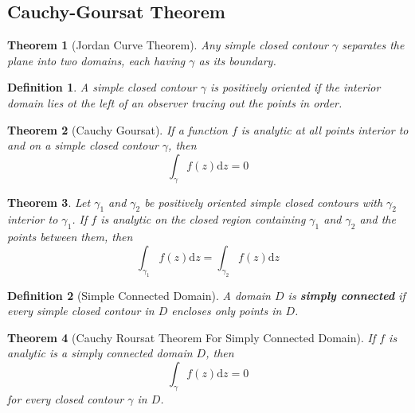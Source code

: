 \documentclass[12pt]{article}
\newcommand{\diff}{\mathrm{d}}
\newtheorem{definition}{Definition}[section]
\newtheorem{theorem}{Theorem}[section]
\theoremstyle{definition}
\begin{document}
\subsection{Cauchy-Goursat Theorem}
\begin{theorem}[Jordan Curve Theorem]
\normalfont Any simple closed contour $\gamma$ separates the plane into two domains, each having $\gamma$ as its boundary.
\end{theorem}
\begin{definition} \normalfont A simple closed contour $\gamma$ is positively oriented if the interior domain lies ot the left of an observer tracing out the points in order.
\end{definition}
\begin{theorem}[Cauchy Goursat]
\normalfont If a function $f$ is analytic at all points interior to and on a simple closed contour $\gamma$, then
\[
\int_{\gamma}f(z)\diff z = 0
\]
\end{theorem}
\begin{theorem}\normalfont Let $\gamma_1$ and $\gamma_2$ be positively oriented simple closed contours with $\gamma_2$ interior to $\gamma_1$. If $f$ is analytic on the closed region containing $\gamma_1$ and $\gamma_2$ and the points between them, then
\[
\int_{\gamma_1}f(z)\diff z = \int_{\gamma_2}f(z)\diff z
\]
\end{theorem}
\begin{definition}[Simple Connected Domain]
\normalfont A domain $D$ is \textbf{simply connected} if every simple closed contour in $D$ encloses only points in $D$.
\end{definition}
\begin{theorem}[Cauchy Roursat Theorem For Simply Connected Domain]
\normalfont If $f$ is analytic is a simply connected domain $D$, then
\[
\int_{\gamma}f(z)\diff z = 0
\]
for every closed contour $\gamma$ in $D$.
\end{theorem}
\end{document}
